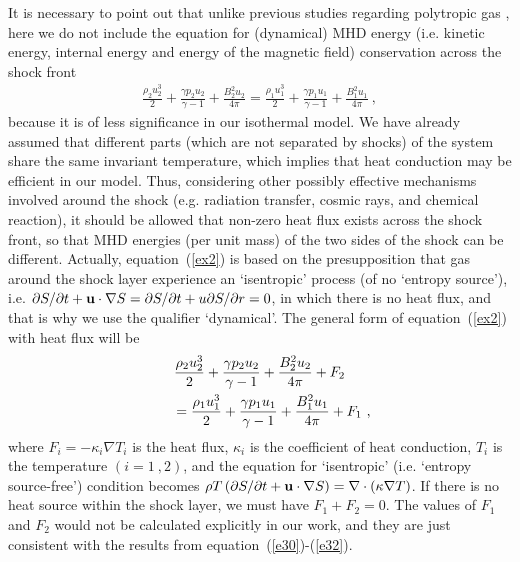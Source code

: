 \documentclass[fleqn,usenatbib]{mnras}
\begin{document}
It is necessary to point out that unlike previous studies regarding polytropic gas \citep{lou2006self,wang2008dynamic},  here we do not include the equation for (dynamical) MHD energy (i.e. kinetic energy, internal energy and energy of the magnetic field) conservation across the shock front 
\begin{gather}
\frac{\rho_{2} u_{2}^{3}}{2}+\frac{\gamma p_{2} u_{2}}{\gamma-1}+\frac{B_{2}^{2}u_{2}}{4\pi}=\frac{\rho_{1} u_{1}^{3}}{2}+\frac{\gamma p_{1} u_{1}}{\gamma-1}+\frac{B_{1}^{2}u_{1}}{4\pi}\ ,\label{ex2}
\end{gather}
because it is of less significance in our isothermal model. We have already assumed that different parts (which are not separated by shocks) of the system share the same invariant temperature, which implies that heat conduction may be efficient in our model. Thus, considering other possibly effective mechanisms involved around the shock (e.g. radiation transfer, cosmic rays, and chemical reaction), it should be allowed that non-zero heat flux exists across the shock front, so that MHD energies (per unit mass) of the two sides of the shock can be different. Actually, equation~(\ref{ex2}) is based on the presupposition that gas around the shock layer experience an `isentropic' process (of no `entropy source'), i.e. $\partial S/\partial t+{\bf{u}} \cdot\nabla S=\partial S/\partial t+u\partial S/\partial r=0$, in which there is no heat flux, and that is why we use the qualifier `dynamical'. The general form of equation~(\ref{ex2}) with heat flux will be 
\begin{gather}
\frac{\rho_{2} u_{2}^{3}}{2}+\frac{\gamma p_{2} u_{2}}{\gamma-1}+\frac{B_{2}^{2}u_{2}}{4\pi}+F_{2}\notag\\
\qquad=\frac{\rho_{1} u_{1}^{3}}{2}+\frac{\gamma p_{1} u_{1}}{\gamma-1}+\frac{B_{1}^{2}u_{1}}{4\pi}+F_{1}\ ,\label{ex4} 
\end{gather}
where $F_{i}=-\kappa_{i} \nabla T_{i}$ is the heat flux, $\kappa_{i}$ is the coefficient of heat conduction, $T_{i}$ is the temperature $(i=1\ ,2)$, and the equation for `isentropic' (i.e. `entropy source-free') condition becomes $\rho T\left(\partial S/\partial t+{\bf{u}} \cdot\nabla S\right)=\nabla\cdot \left(\kappa\nabla T\right)$. If there is no heat source within the shock layer, we must have $F_{1}+F_{2}=0$. The values of $F_{1}$ and $F_{2}$ would not be calculated explicitly in our work, and they are just consistent with the results from equation~(\ref{e30})-(\ref{e32}).
\end{document}
